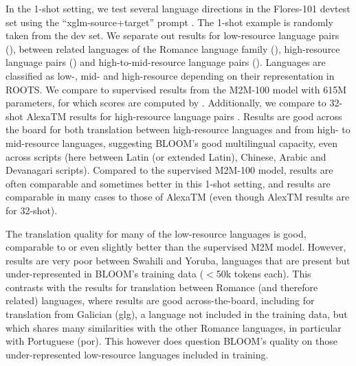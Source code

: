 \documentclass[twoside,11pt]{article}
\begin{document}
In the 1-shot setting, we test several language directions in the Flores-101 \citep{goyal-etal-2022-flores} devtest set using the ``xglm-source+target'' prompt \citep{lin2021xglm}. %
The 1-shot example is randomly taken from the dev set.
We separate out results for low-resource language pairs (), between related languages of the Romance language family (), high-resource language pairs () and high-to-mid-resource language pairs (). %
Languages are classified as low-, mid- and high-resource depending on their representation in ROOTS.
We compare to supervised results from the M2M-100 model \citep{fan-etal-2021-beyond} with 615M parameters, for which scores are computed by \cite{goyal-etal-2022-flores}. Additionally, we compare to %
32-shot AlexaTM results for high-resource language pairs \citep{soltan-etal-2022-alexatm}. %
%
Results are good across the board for both translation between high-resource languages and from high- to mid-resource languages, suggesting BLOOM's good multilingual capacity, even across scripts (here between Latin (or extended Latin), Chinese, Arabic and Devanagari scripts). Compared to the supervised M2M-100 model, results are often comparable and sometimes better in this 1-shot setting, and results are comparable in many cases to those of AlexaTM (even though AlexTM results are for 32-shot).

The translation quality for many of the low-resource languages is good, comparable to or even slightly better than the supervised M2M model.
However, results are very poor between Swahili and Yoruba, languages that are present but under-represented in BLOOM's training data ($<$50k tokens each). This contrasts with the results for translation between Romance (and therefore related) languages, where results are good across-the-board, including for translation from Galician (glg), a language not included in the training data, but which shares many similarities with the other Romance languages, in particular with Portuguese (por). This however does question BLOOM's quality on those under-represented low-resource languages included in training.
\end{document}
